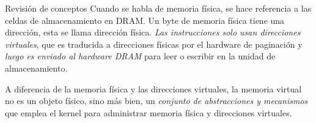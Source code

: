 \documentclass{libs/ufc_format}
\begin{document}
\begin{frame}{Revisión de conceptos}
    Cuando se habla de memoria física, se hace referencia a las celdas de almacenamiento en DRAM. Un byte de memoria física tiene una dirección, esta se llama dirección física. \emph{Las instrucciones solo usan direcciones virtuales}, que es traducida a direcciones físicas por el hardware de paginación y \emph{luego es enviado al hardware DRAM} para leer o escribir en la unidad de almacenamiento.
    
    \vspace{0.3cm}

    A diferencia de la memoria física y las direcciones virtuales, la memoria virtual no es un objeto físico, sino más bien, un \emph{conjunto de abstracciones y mecanismos} que emplea el kernel para administrar memoria física y direcciones virtuales. \cite{xv6_book}
\end{frame}
\end{document}
